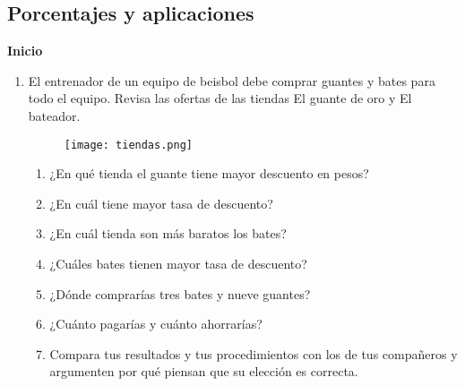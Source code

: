 \subsection{Porcentajes y aplicaciones}
\begin{boxK}
    \begin{center}\textbf{Inicio}\end{center}

    \begin{enumerate}
        \item El entrenador de un equipo de beisbol debe comprar guantes y bates para todo el equipo.
              Revisa las ofertas de las tiendas El guante de oro y El bateador.
              \begin{figure}[H]
                  \centering
                  \texttt{[image: tiendas.png]}
                  \label{fig:tiendas}
              \end{figure}
              \begin{enumerate}
                  \item ¿En qué tienda el guante tiene mayor descuento en pesos?
                  \item ¿En cuál tiene mayor tasa de descuento?
                  \item ¿En cuál tienda son más baratos los bates?
                  \item ¿Cuáles bates tienen mayor tasa de descuento?
                  \item ¿Dónde comprarías tres bates y nueve guantes?
                  \item ¿Cuánto pagarías y cuánto ahorrarías?
                  \item Compara tus resultados y tus procedimientos con los de tus
                        compañeros y argumenten por qué piensan que su elección
                        es correcta.
              \end{enumerate}
    \end{enumerate}
\end{boxK}

